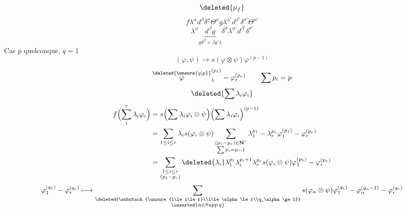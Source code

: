 \[
\deleted{\mu_f}
\]
\[
f\lambda^\alpha d^\beta\delta^\sigma\Theta^n
g\lambda^{\alpha'}d^{\beta'}\delta^{\sigma'}\Theta^{n'}
\]
\[
\lambda^\alpha\underbrace{d^\beta g}_{g d^\beta+\beta g'\lambda}
\delta^\sigma\lambda^{\alpha'}d^{\beta'}\delta^{\sigma'}
\]
Cas $p$ quelconque, $q=1$
\diagram{\begin{tikzcd}
\Gamma^{*+}\Phi_*\otimes\Lambda^{\deleted{\unsure{\epsilon}}\inserted{*}}\Psi_*\arrow[d]\\
\Gamma^{*+}\Phi_*\otimes\Lambda^*\Phi_*
\end{tikzcd}}
\[
(\varphi,\psi)\longrightarrow s(\varphi\otimes\psi)\varphi^{(p-1)}
\]
\[
\overset{\deleted{\unsure{q|p}}}{\varphi}_1^{(p_1)}-\varphi_r^{(p_r)}\qquad\sum p_i=p
\]
\[
\deleted{\sum\lambda_i\varphi_i}
\]
\[
\begin{aligned}
f\Bigl(\sum_i^r\lambda_i\varphi_i\Bigr)
&=s\Bigl(\sum\lambda_i\varphi_i\otimes\psi\Bigr)
\Bigl(\sum\lambda_i\varphi_i\Bigr)^{(p-1)}\\
&=\sum_{1\le i\le r}\lambda_i s(\varphi_i\otimes\psi)
\sum_{\substack{(p_1-p_r)\in\mathbf N^r\\\sum p_i=p-1}}
\lambda_1^{p_1}-\lambda_r^{p_r}\varphi_1^{(p_1)}-\varphi_r^{(p_r)}\\
&=\sum_{\substack{1\le i\le r\\(p_1-p_r)}}
\deleted{\lambda_i}\lambda_1^{p_1}\lambda_i^{p_i+1}\lambda_r^{p_r}
s(\varphi_i\otimes\psi)\varphi_1^{(p_1)}-\varphi_r^{(p_r)}
\end{aligned}
\]
\[
\varphi_1^{(q_1)}-\varphi_r^{(q_r)}\longmapsto
\sum_{\substack{\deleted{\substack{\unsure{1\le i\le r}\\1\le\alpha\le r\\q_\alpha\ge1}}\\\inserted{\alpha\in\operatorname{Supp}q}}}
s(\varphi_\alpha\otimes\psi)\varphi_1^{(q_1)}-
\varphi_\alpha^{(q_\alpha-1)}-\varphi_r^{(q_r)}
\]
